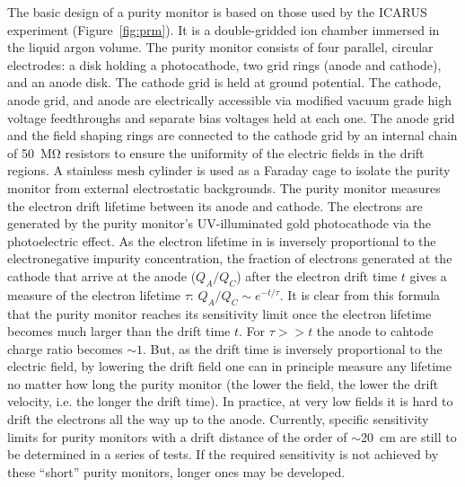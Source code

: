 The basic design of a purity monitor is based on those used by the ICARUS experiment (Figure~\ref{fig:prm})\cite{Adamowski:2014daa}. It is a double-gridded ion chamber immersed in the liquid argon volume.   The purity monitor consists of four parallel, circular electrodes: a disk holding a photocathode, two grid rings (anode and cathode), and an anode disk. The cathode grid is held at ground potential. The cathode, anode grid, and anode are electrically accessible via modified vacuum grade high voltage feedthroughs and separate bias voltages held at each one.  The anode grid and the field shaping rings are connected to the cathode grid by an internal chain of \SI{50}{\mega\ohm} resistors to ensure the uniformity of the electric fields in the drift regions. A stainless mesh cylinder is used as a Faraday cage to isolate the purity monitor from external electrostatic backgrounds. The purity monitor measures the electron drift lifetime between its anode and cathode. The electrons are generated by the purity monitor's UV-illuminated gold photocathode via the photoelectric effect. As the electron lifetime in  is inversely proportional to the electronegative impurity concentration, the fraction of electrons generated at the cathode that arrive at the anode ($Q_A/Q_C$) after the electron drift time $t$ gives a measure of the electron lifetime $\tau$:
%
\( Q_A/Q_C \sim e^{-t/\tau}.\)
%
%
It is clear from this formula that the purity monitor reaches its sensitivity limit once the electron lifetime becomes much larger than the drift time $t$. For $\tau >> t$ the anode to cahtode charge ratio becomes $\sim 1$. But, as the drift time is inversely proportional to the electric field, by lowering the drift field one can in principle measure any lifetime no matter how long the purity monitor (the lower the field, the lower the drift velocity, i.e. the longer the drift time). In practice, at very low fields it is hard to drift the electrons all the way up to the anode. Currently, specific sensitivity limits for purity monitors with a drift distance of the order of $\sim$\SI{20}{\centi\meter} are still to be determined in a series of tests. If the required sensitivity is not achieved by these ``short'' purity monitors, longer ones may be developed.

